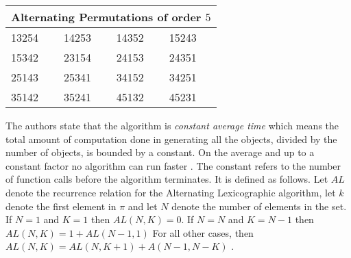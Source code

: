 \begin{center}
\begin{table}
\begin{tabular}{ |p{3cm}||p{3cm}|p{3cm}|p{3cm}|  }
 \hline
 \multicolumn{4}{|c|}{Alternating Permutations of order $5$} \\
 \hline
 \hline
 13254   & 14253    &14352&  15243\\\hline
 15342&  23154  & 24153   &24351\\\hline
 25143 &25341 & 34152&  34251\\\hline
 35142    &35241 & 45132&  45231\\
 \hline
\end{tabular}
\label{Table:AltPerms}
\end{table}
\end{center}

The authors state that the algorithm is \emph{constant average time} which means the total amount of
computation done in generating all the objects, divided by the number of objects, is
bounded by a constant. On the average and up to a constant factor no algorithm can
run faster \cite{A19}. The constant refers to the number of function calls before the algorithm terminates. It is defined as follows. 
Let $AL$ denote the recurrence relation for the Alternating Lexicographic algorithm, let $k$ denote the 
first element in $\pi$ and let $N$ denote the number of elements in the set. 
If $N=1$ and $K=1$ then $AL(N, K)=0$. If $N=N$ and $K=N-1$ then $AL(N,K)= 1 + AL(N-1,1)$ For all other cases, 
then $AL(N, K) = AL(N, K+1) + A(N-1, N-K)$ \cite{A19}.


